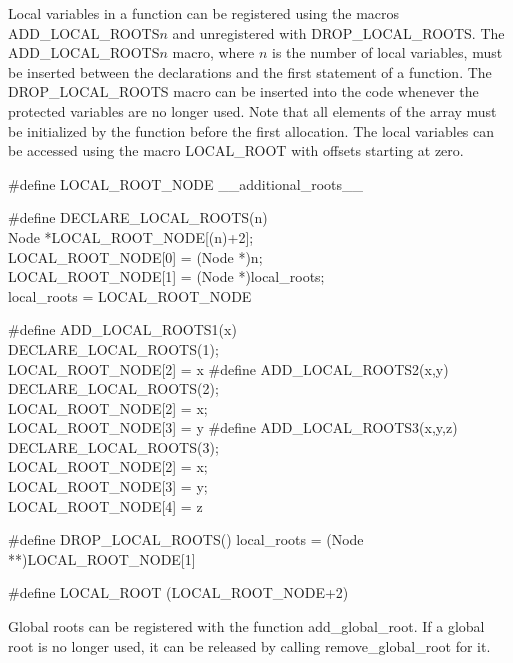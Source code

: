 \nwendcode{}\nwdocspar
Local variables in a function can be registered using the macros
{\Tt{}ADD{\_}LOCAL{\_}ROOTS\nwendquote}$n$ and unregistered with {\Tt{}DROP{\_}LOCAL{\_}ROOTS\nwendquote}. The
{\Tt{}ADD{\_}LOCAL{\_}ROOTS\nwendquote}$n$ macro, where $n$ is the number of local
variables, must be inserted between the declarations and the first
statement of a function. The {\Tt{}DROP{\_}LOCAL{\_}ROOTS\nwendquote} macro can be
inserted into the code whenever the protected variables are no longer
used. Note that all elements of the array must be initialized by the
function before the first allocation. The local variables can be
accessed using the macro {\Tt{}LOCAL{\_}ROOT\nwendquote} with offsets starting at zero.

\nwenddocs{}\plusendmoddef\nwstartdeflinemarkup{}\nwenddeflinemarkup
#define LOCAL_ROOT_NODE __additional_roots__

#define DECLARE_LOCAL_ROOTS(n) \\
    Node *LOCAL_ROOT_NODE[(n)+2]; \\
    LOCAL_ROOT_NODE[0] = (Node *)n; \\
    LOCAL_ROOT_NODE[1] = (Node *)local_roots; \\
    local_roots = LOCAL_ROOT_NODE

#define ADD_LOCAL_ROOTS1(x) \\
    DECLARE_LOCAL_ROOTS(1); \\
    LOCAL_ROOT_NODE[2] = x
#define ADD_LOCAL_ROOTS2(x,y) \\
    DECLARE_LOCAL_ROOTS(2); \\
    LOCAL_ROOT_NODE[2] = x; \\
    LOCAL_ROOT_NODE[3] = y
#define ADD_LOCAL_ROOTS3(x,y,z) \\
    DECLARE_LOCAL_ROOTS(3); \\
    LOCAL_ROOT_NODE[2] = x; \\
    LOCAL_ROOT_NODE[3] = y; \\
    LOCAL_ROOT_NODE[4] = z

#define DROP_LOCAL_ROOTS() local_roots = (Node **)LOCAL_ROOT_NODE[1]

#define LOCAL_ROOT (LOCAL_ROOT_NODE+2)

\nwendcode{}\nwdocspar
Global roots can be registered with the function {\Tt{}add{\_}global{\_}root\nwendquote}.
If a global root is no longer used, it can be released by calling
{\Tt{}remove{\_}global{\_}root\nwendquote} for it.

